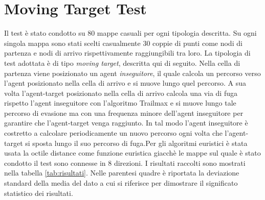 \documentclass[11pt]{book}
\begin{document}
{\begin{algorithm}

  
\end{algorithm}

\section{Moving Target Test}
\par{Il test \`e stato condotto su 80 mappe casuali per ogni tipologia descritta. Su ogni singola mappa sono stati scelti casualmente 30 coppie di punti come nodi di partenza e nodi di arrivo rispettivamente raggiungibili tra loro. La tipologia di test adottata \`e di tipo \emph{moving target}, descritta qui di seguito. Nella cella di partenza viene posizionato un agent \emph{inseguitore}, il quale calcola un percorso verso l'agent posizionato nella cella di arrivo e si muove lungo quel percorso. A sua volta l'agent-target posizionato nella cella di arrivo calcola una via di fuga rispetto l'agent inseguitore con l'algoritmo Trailmax e si muove lungo tale percorso di evasione ma con una frequenza minore dell'agent inseguitore per garantire che l'agent-target venga raggiunto. In tal modo l'agent inseguitore \`e costretto a calcolare periodicamente un nuovo percorso ogni volta che l'agent-target si sposta lungo il suo percorso di fuga.Per gli algoritmi euristici \`e stata usata la octile distance come funzione euristica giacch\`e le mappe sul quale \`e stato condotto il test sono connesse in 8 direzioni. I risultati raccolti sono mostrati nella tabella \ref{tab:risultati}. Nelle parentesi quadre \`e riportata la deviazione standard della media del dato a cui si riferisce per dimostrare il significato statistico dei risultati.}

}
\end{document}
